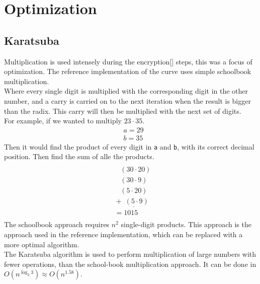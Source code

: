 \section{Optimization}

\subsection{Karatsuba}
Multiplication is used intensely during the encryption[] steps, this was a focus of optimization. The reference implementation of the curve uses simple schoolbook multiplication.\\
Where every single digit is multiplied with the corresponding digit in the other number, and a carry is carried on to the next iteration when the result is bigger than the radix. This carry will then be multiplied with the next set of digits.\\
For example, if we wanted to multiply $23 \cdot 35$.
\begin{equation*}
    \begin{split}
        & a = 29\\
        & b = 35
    \end{split}
\end{equation*}
Then it would find the product of every digit in \texttt{a} and \texttt{b}, with its correct decimal position. Then find the sum of alle the products.
\begin{equation*}
    \begin{split}
        \\
       &\;\;\;\;(30 \cdot 20)\\
       &\;\;\;\;(30 \cdot 9)\\
       &\;\;\;\;(5 \cdot 20)\\
       &\underline{\;+ \; (5 \cdot 9)\;\;\;}\\
       &\; = 1015\\
    \end{split}
\end{equation*}
The schoolbook approach requires $n^{2}$ single-digit products. 
This approach is the approach used in the reference implementation, which can be replaced with a more optimal algorithm.\medskip
\\
\label{karat-opti}The Karatsuba algorithm is used to perform multiplication of large numbers with fewer operations, than the school-book multiplication approach. It can be done in $O(n^{\log_{2}3}) \approx O(n^{1.58})$.\medskip
